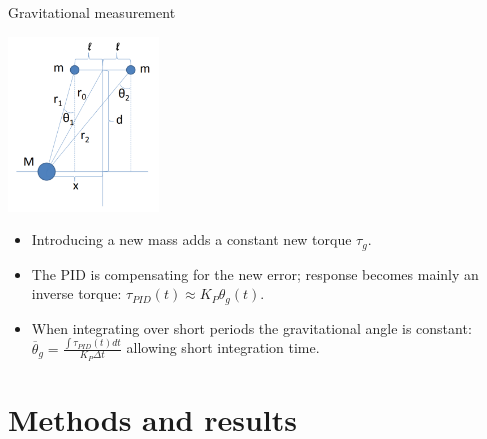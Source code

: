 \documentclass{beamer}
\begin{document}
\begin{frame}{\hypertarget{frame:Gravimetric measurement}{Gravitational measurement}}
	\begin{center}		
		\includegraphics[width=0.3\textwidth,keepaspectratio]{Cavendish apparatus.PNG}
    \end{center}
	\begin{itemize}
		
		\pause
		\item Introducing a new mass adds a constant new torque $\tau_g$. 
		\item The PID is compensating for the new error; response becomes mainly an inverse torque: $\tau_{PID}(t) \approx K_P\theta_g(t)$. 
		\item When integrating over short periods the gravitational angle is constant: $\overline{\theta}_g =  \frac{\int \tau_{PID}(t) dt}{ K_P \Delta t} $ allowing short integration time.
		
		
	\end{itemize}
\end{frame}

\section{Methods and results}
\end{document}
